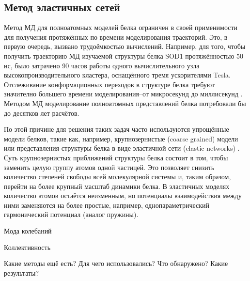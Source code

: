 \subsection{Метод эластичных сетей} \label{subsect_methods_EN}

Метод МД для полноатомных моделей белка ограничен в своей применимости для получения протяжённых по времени моделирования траекторий. Это, в первую очередь, вызвано трудоёмкостью вычислений. Например, для того, чтобы получить траекторию МД изучаемой структуры белка SOD1 протяжённостью 50 нс, было затрачено 90 часов работы одного вычислительного узла высокопроизводительного кластера, оснащённого тремя ускорителями Tesla. Отслеживание конформационных переходов в структуре белка требуют значително большего времени моделирования--от микросекунд до миллисекунд \cite{Ding2008}. Методом МД моделирование полноатомных представлений белка потребовали бы до десятков лет расчётов. 

По этой причине для решения таких задач часто используются упрощённые модели белков, такие как, например, крупнозернистые (coarse grained) модели \cite{Rudd1998} или представления структуры белка в виде эластичной сети (elastic networks) \cite{Tirion1996}. Суть крупнозернистых приближений структуры белка состоит в том, чтобы заменить целую группу атомов одной частицей. Это позволяет снизить количество степеней свободы всей молекулярной системы и, таким образом, перейти на более крупный масштаб динамики белка. В эластичных моделях количество атомов остаётся неизменным, но потенциалы взаимодействия между ними заменяются на более простые, например, однопараметрический гармонический потенциал (аналог пружины).

Мода колебаний

Коллективность

Какие методы ещё есть? 
Для чего использовались? 
Что обнаружено? 
Какие результаты?

